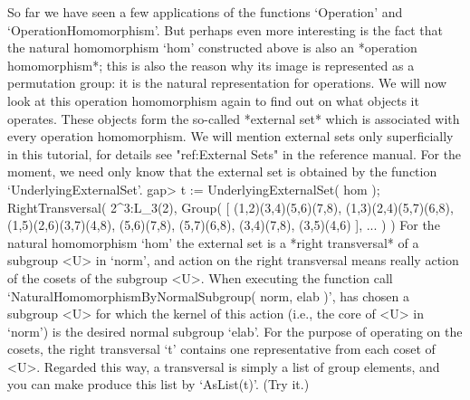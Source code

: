 So far we have seen  a few applications  of the functions `Operation' and
`OperationHomomorphism'. But perhaps even  more  interesting is the  fact
that  the  natural  homomorphism `hom'   constructed  above  is  also  an
*operation  homomorphism*;  this  is also  the  reason  why its image  is
represented as a permutation group:  it is the natural representation for
operations. We will now look at this operation homomorphism again to find
out on what   objects it  operates.  These  objects  form the   so-called
*external set* which is  associated with every operation homomorphism. We
will  mention  external sets  only   superficially in this  tutorial, for
details see "ref:External Sets" in the  reference manual. For the moment,
we need   only know that   the external set is  obtained  by the function
`UnderlyingExternalSet'.
\beginexample
    gap> t := UnderlyingExternalSet( hom );
    RightTransversal( 2^3:L_3(2), Group( 
    [ (1,2)(3,4)(5,6)(7,8), (1,3)(2,4)(5,7)(6,8), (1,5)(2,6)(3,7)(4,8), 
      (5,6)(7,8), (5,7)(6,8), (3,4)(7,8), (3,5)(4,6) ], ... ) )
\endexample
{}%
For  the   natural homomorphism   `hom' the  external   set  is a  *right
transversal* of a subgroup  <U>   in `norm',  and   action on the   right
transversal means really action  of the cosets  of the subgroup <U>. When
executing  the function  call `NaturalHomomorphismByNormalSubgroup( norm,
elab )', {\GAP} has  chosen a subgroup  <U> for which  the kernel of this
action (i.e., the core of  <U> in `norm')  is the desired normal subgroup
`elab'. For the purpose of operating on the cosets, the right transversal
`t' contains  one representative  from each coset  of <U>.  Regarded this
way, a transversal  is simply a list of  group elements, and you can make
{\GAP} produce this list by `AsList(t)'. (Try it.)

